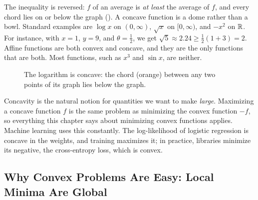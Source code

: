 The inequality is reversed: $f$ of an average is \emph{at least} the
average of $f$, and every chord lies on or below the graph
(). A concave function is a dome rather than a bowl.
Standard examples are $\log x$ on $(0, \infty)$, $\sqrt{x}$ on
$[0, \infty)$, and $-x^2$ on $\mathbb{R}$. For instance, with $x = 1$, $y = 9$, and
$\theta = \tfrac12$, we get $\sqrt{5} \approx 2.24 \ge \tfrac12 (1 + 3) =
2$. Affine functions are both convex and concave, and they are the only
functions that are both. Most functions, such as $x^3$ and $\sin x$, are
neither.

\begin{figure}[ht]
  \centering
  \caption{The logarithm is concave: the chord (orange) between any two
    points of its graph lies below the graph.}
  \label{fig:ch01-concave}
\end{figure}

Concavity is the natural notion for quantities we want to make
\emph{large}. Maximizing a concave function $f$ is the same problem as
minimizing the convex function $-f$, so everything this chapter says about
minimizing convex functions applies. Machine learning uses this constantly.
The log-likelihood of logistic regression is concave in the weights, and
training maximizes it; in practice, libraries minimize its negative, the
cross-entropy loss, which is convex.

\subsection{Why Convex Problems Are Easy: Local Minima Are Global}
\label{sec:ch01-local-global}

